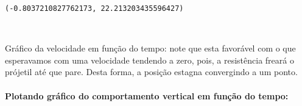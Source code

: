 \documentclass[12pt, a4paper]{article}
\makeatletter
\newcommand{\boxspacing}{\kern\kvtcb@left@rule\kern\kvtcb@boxsep}
\newcommand{\prompt}[4]{
        {\ttfamily\llap{{\color{#2}[#3]:\hspace{3pt}#4}}\vspace{-\baselineskip}}
    }
\makeatother
\begin{document}
            \begin{tcolorbox}[breakable, size=fbox, boxrule=.5pt, pad at break*=1mm, opacityfill=0]
\prompt{Out}{outcolor}{6}{\boxspacing}
\begin{Verbatim}[commandchars=\\\{\}]
(-0.8037210827762173, 22.213203435596427)
\end{Verbatim}
\end{tcolorbox}
        
    \begin{center}
    \end{center}
    { \hspace*{\fill} \\}
    
    Gráfico da velocidade em função do tempo: note que esta favorável com o
que esperavamos com uma velocidade tendendo a zero, pois, a resistência
freará o prójetil até que pare. Desta forma, a posição estagna
convergindo a um ponto.

\hypertarget{plotando-gruxe1fico-do-comportamento-vertical-em-funuxe7uxe3o-do-tempo}{%
\paragraph{Plotando gráfico do comportamento vertical em função do
tempo:}\label{plotando-gruxe1fico-do-comportamento-vertical-em-funuxe7uxe3o-do-tempo}}
\end{document}
